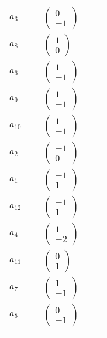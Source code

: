 \documentclass[1p]{elsarticle_modified}
\theoremstyle{definition}
\begin{document}
\begin{tabular}{m{7pt} m{180pt} m{7pt} m{180pt} }
\flushright $a_{3}=$&$\begin{pmatrix}0\\-1\end{pmatrix}$ \\
\flushright $a_{8}=$&$\begin{pmatrix}1\\0\end{pmatrix}$ \\
\flushright $a_{6}=$&$\begin{pmatrix}1\\-1\end{pmatrix}$ \\
\flushright $a_{9}=$&$\begin{pmatrix}1\\-1\end{pmatrix}$ \\
\flushright $a_{10}=$&$\begin{pmatrix}1\\-1\end{pmatrix}$ \\
\flushright $a_{2}=$&$\begin{pmatrix}-1\\0\end{pmatrix}$ \\
\flushright $a_{1}=$&$\begin{pmatrix}-1\\1\end{pmatrix}$ \\
\flushright $a_{12}=$&$\begin{pmatrix}-1\\1\end{pmatrix}$ \\
\flushright $a_{4}=$&$\begin{pmatrix}1\\-2\end{pmatrix}$ \\
\flushright $a_{11}=$&$\begin{pmatrix}0\\1\end{pmatrix}$ \\
\flushright $a_{7}=$&$\begin{pmatrix}1\\-1\end{pmatrix}$ \\
\flushright $a_{5}=$&$\begin{pmatrix}0\\-1\end{pmatrix}$\\&\end{tabular}
\end{document}
